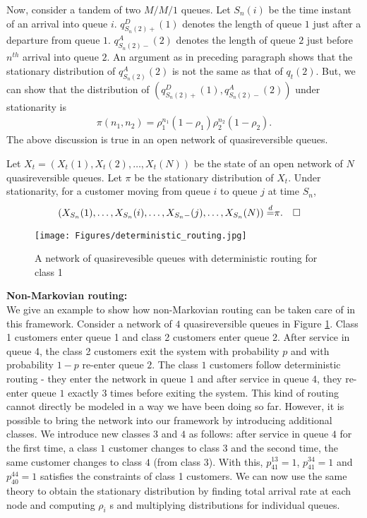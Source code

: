 \documentclass[all-lectures.tex]{subfiles}
\newcommand*{\QEDB}{\hfill\ensuremath{\square}}%
\begin{document}
Now, consider a tandem of two $M/M/1$ queues. Let $S_n(i)$ be the time instant of an arrival into queue $i$. $q_{S_n(2)+}^D(1)$ denotes the length of queue $1$ just after a departure from queue $1$. $q_{S_n(2)-}^A(2)$ denotes the length of queue $2$ just before $n^{th}$ arrival into queue $2$. An argument as in preceding paragraph shows that the stationary distribution of $q^A_{S_n(2)}(2)$ is not the same as that of $q_t(2)$. But, we can show that the distribution of $\left(q_{S_n(2)+}^D(1),q_{S_n(2)-}^A(2)\right)$ under stationarity is 
\begin{align*}
\pi(n_1,n_2) = \rho_1^{n_1} (1-\rho_1) \rho_2^{n_2} (1-\rho_2).
\end{align*}
The above discussion is true in an open network of quasireversible queues. 
\begin{thm}
Let $X_t = (X_t(1),X_t(2),\dots,X_t(N))$ be the state of an open network of $N$ quasireversible queues. Let $\pi$ be the stationary distribution of $X_t$. Under stationarity, for a customer moving from queue $i$ to queue $j$ at time $S_n$,
\begin{align*}
(X_{S_n}(1),\dots,X_{S_n}(i),\dots,X_{S_n-}(j),\dots,X_{S_n}(N)) \stackrel{d}{=}&  \pi. && \QEDB 
\end{align*}
\end{thm}
\begin{figure}
\centering
\texttt{[image: Figures/deterministic\_routing.jpg]}
\caption{A network of quasirevesible queues with deterministic routing for class 1}
\label{fig:det_routing}
\end{figure}
\noindent \textbf{Non-Markovian routing: } \\
\indent We give an example to show how non-Markovian routing can be taken care of in this framework. Consider a network of $4$ quasireversible queues in Figure \ref{fig:det_routing}. Class 1 customers enter queue 1 and class 2 customers enter queue 2. After service in queue 4, the class 2 customers exit the system with probability $p$ and with probability $1-p$ re-enter queue $2$. The class $1$ customers follow deterministic routing - they enter the network in queue $1$ and after service in queue $4$, they re-enter queue $1$ exactly $3$ times before exiting the system. This kind of routing cannot directly be modeled in a way we have been doing so far. However, it is possible to bring the network into our framework by introducing additional classes. We introduce new classes $3$ and $4$ as follows: after service in queue $4$ for the first time, a class $1$ customer changes to class $3$ and the second time, the same customer changes to class $4$ (from class 3). With this, $p_{41}^{13} = 1$, $p_{41}^{34} = 1$ and $p_{40}^{44} = 1$ satisfies the constraints of class 1 customers. We can now use the same theory to obtain the stationary distribution by finding total arrival rate at each node and computing $\rho_i$ s and multiplying distributions for individual queues.  \\
\end{document}
